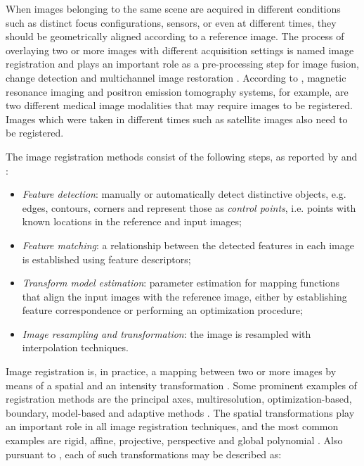 When images belonging to the same scene are acquired in different conditions such as distinct focus configurations, sensors, or even at different times, they should be geometrically aligned according to a reference image. The process of overlaying two or more images with different acquisition settings is named image registration and plays an important role as a pre-processing step for image fusion, change detection and multichannel image restoration \cite{zitova2003image}. According to , magnetic resonance imaging and positron emission tomography systems, for example, are two different medical image modalities that may require images to be registered. Images which were taken in different times such as satellite images also need to be registered.

The image registration methods consist of the following steps, as reported by  and :

\begin{itemize}
    \item \emph{Feature detection}: manually or automatically detect distinctive objects, e.g. edges, contours, corners and represent those as \emph{control points}, i.e. points with known locations in the reference and input images;

    \item \emph{Feature matching}: a relationship between the detected features in each image is established using feature descriptors;

    \item \emph{Transform model estimation}: parameter estimation for mapping functions that align the input images with the reference image, either by establishing feature correspondence or performing an optimization procedure;

    \item \emph{Image resampling and transformation}: the image is resampled with interpolation techniques.

\end{itemize}

Image registration is, in practice, a mapping between two or more images by means of a spatial and an intensity transformation \cite{brown1992survey}. Some prominent examples of registration methods are the principal axes, multiresolution, optimization-based, boundary, model-based and adaptive methods  \cite{goshtasby2012image}. The spatial transformations play an important role in all image registration techniques, and the most common examples are rigid, affine, projective, perspective and global polynomial \cite{brown1992survey}. Also pursuant to , each of such transformations may be described as:

